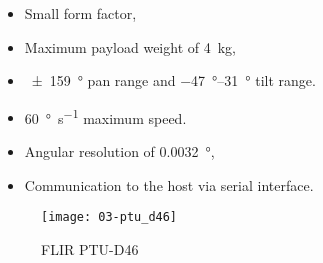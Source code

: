 \begin{itemize}
    \item Small form factor,
    \item Maximum payload weight of \SI{4}{\kilo\gram},
    \item \SI{+-159}{\degree} pan range and \SIrange{-47}{+31}{\degree} tilt range.
    \item \SI{60}{\degree \per \second} maximum speed.
    \item Angular resolution of \SI{0.0032}{\degree},
    \item Communication to the host via serial interface.
\end{itemize}

\begin{figure}[h]
    \centering
    \texttt{[image: 03-ptu\_d46]}
    \caption{FLIR PTU-D46}
    \label{figure:pan_tilt_d46}
\end{figure}